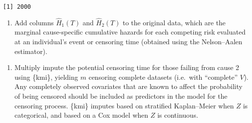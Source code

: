 \documentclass[
  12pt,
  a4paper,
]{article}
\newenvironment{Shaded}{\begin{snugshade}}{\end{snugshade}}
\newcommand{\AttributeTok}[1]{\textcolor[rgb]{0.40,0.45,0.13}{#1}}
\newcommand{\CommentTok}[1]{\textcolor[rgb]{0.37,0.37,0.37}{#1}}
\newcommand{\DecValTok}[1]{\textcolor[rgb]{0.68,0.00,0.00}{#1}}
\newcommand{\FunctionTok}[1]{\textcolor[rgb]{0.28,0.35,0.67}{#1}}
\newcommand{\NormalTok}[1]{\textcolor[rgb]{0.00,0.23,0.31}{#1}}
\newcommand{\OtherTok}[1]{\textcolor[rgb]{0.00,0.23,0.31}{#1}}
\newcommand{\SpecialCharTok}[1]{\textcolor[rgb]{0.37,0.37,0.37}{#1}}
\newcommand{\StringTok}[1]{\textcolor[rgb]{0.13,0.47,0.30}{#1}}
\providecommand{\tightlist}{%
  \setlength{\itemsep}{0pt}\setlength{\parskip}{0pt}}\usepackage{longtable,booktabs,array}
\begin{document}
\begin{verbatim}
[1] 2000
\end{verbatim}

\begin{enumerate}
\def\labelenumi{\arabic{enumi}.}
\tightlist
\item
  Add columns \(\hat{H}_1(T)\) and \(\hat{H}_2(T)\) to the original
  data, which are the marginal cause-specific cumulative hazards for
  each competing risk evaluated at an individual's event or censoring
  time (obtained using the Nelson--Aalen estimator).
\end{enumerate}

\begin{Shaded}
\end{Shaded}

\begin{enumerate}
\def\labelenumi{\arabic{enumi}.}
\setcounter{enumi}{1}
\tightlist
\item
  Multiply impute the potential censoring time for those failing from
  cause 2 using \{kmi\}, yielding \(m\) censoring complete datasets
  (i.e.~with ``complete'' \(V\)). Any completely observed covariates
  that are known to affect the probability of being censored should be
  included as predictors in the model for the censoring process. \{kmi\}
  imputes based on stratified Kaplan--Meier when \(Z\) is categorical,
  and based on a Cox model when \(Z\) is continuous.
\end{enumerate}
\end{document}
